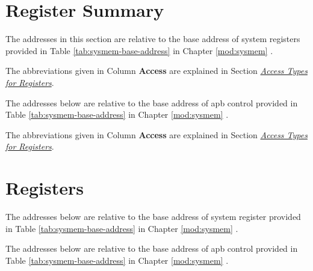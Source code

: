 \documentclass[main\_\_EN.tex]{subfiles}
\begin{document}



\clearpage
\section{Register Summary}
\label{sec:sysreg-reg-summ}
\hypertarget{sysreg-reg-summ}{}

The addresses in this section are relative to the base address of system registers provided in Table \ref{tab:sysmem-base-address} in Chapter \ref{mod:sysmem} \textit{}.

The abbreviations given in Column \textbf{Access} are explained in Section \hyperref[glossary-access-types]{\textit{Access Types for Registers}}.



The addresses below are relative to the base address of apb control provided in Table \ref{tab:sysmem-base-address} in Chapter \ref{mod:sysmem} \textit{}.

The abbreviations given in Column \textbf{Access} are explained in Section \hyperref[glossary-access-types]{\textit{Access Types for Registers}}.





\clearpage
\section{Registers}

The addresses below are relative to the base address of system register provided in Table \ref{tab:sysmem-base-address} in Chapter \ref{mod:sysmem} \textit{}.



The addresses below are relative to the base address of apb control provided in Table \ref{tab:sysmem-base-address} in Chapter \ref{mod:sysmem} \textit{}.


\end{document}
